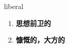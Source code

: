 
\begin{frame}
{\huge liberal}
\begin{center}
\begin{enumerate}\Large
  \item \textbf{思想前卫的}
  \item \textbf{慷慨的，大方的}
\end{enumerate}
\end{center}
\end{frame}
